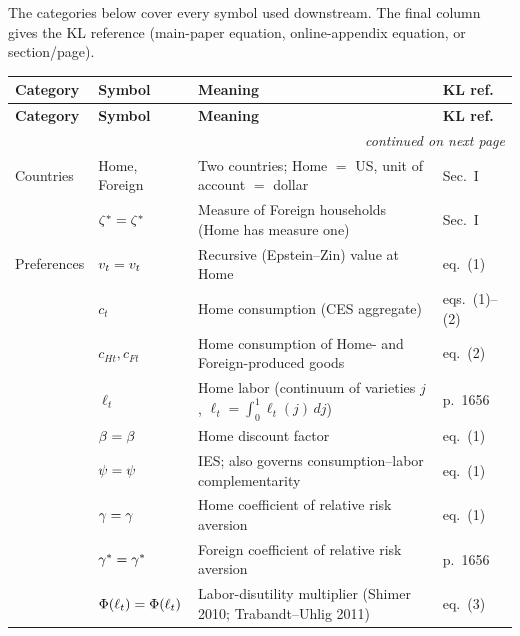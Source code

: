 The categories below cover every symbol used downstream. The final column gives
the KL reference (main-paper equation, online-appendix equation, or
section/page).

\begin{longtable}{@{}p{2.55cm} p{2.0cm} p{7.2cm} p{2.4cm}@{}}
\toprule
\textbf{Category} & \textbf{Symbol} & \textbf{Meaning} & \textbf{KL ref.} \\
\midrule
\endfirsthead
\toprule
\textbf{Category} & \textbf{Symbol} & \textbf{Meaning} & \textbf{KL ref.} \\
\midrule
\endhead
\midrule \multicolumn{4}{r}{\emph{continued on next page}}\\
\endfoot
\bottomrule
\endlastfoot
Countries        & Home, Foreign            & Two countries; Home $=$ US, unit of account $=$ dollar                         & Sec.\ I \\
                 & $\zeta^{*}=\zeta^{*}$          & Measure of Foreign households (Home has measure one)                            & Sec.\ I \\
Preferences      & $v_t=v_t$             & Recursive (Epstein--Zin) value at Home                                          & eq.\ (1) \\
                 & $c_t$                    & Home consumption (CES aggregate)                                               & eqs.\ (1)--(2) \\
                 & $c_{Ht},c_{Ft}$          & Home consumption of Home- and Foreign-produced goods                            & eq.\ (2) \\
                 & $\ell_t$                 & Home labor (continuum of varieties $j$, $\ell_t=\int_0^1\ell_t(j)\,dj$)         & p.\ 1656 \\
                 & $\beta=\beta$            & Home discount factor                                                            & eq.\ (1) \\
                 & $\psi=\psi$              & IES; also governs consumption--labor complementarity                            & eq.\ (1) \\
                 & $\gamma=\gamma$            & Home coefficient of relative risk aversion                                      & eq.\ (1) \\
                 & $\gamma^{*}=\gamma^{*}$       & Foreign coefficient of relative risk aversion                                   & p.\ 1656 \\
                 & $\Phi(\ell_t)=\Phi(\ell_t)$ & Labor-disutility multiplier (Shimer 2010; Trabandt--Uhlig 2011)            & eq.\ (3) \\

\end{longtable}
